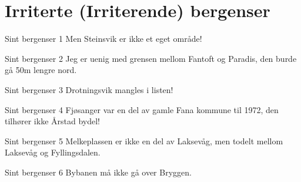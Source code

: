 \section{Irriterte (Irriterende) bergenser}
\begin{frame}
    \begin{block}{Sint bergenser 1}
        Men Steinsvik er ikke et eget område!
    \end{block}
    \pause
    \begin{block}{Sint bergenser 2}
        Jeg er uenig med grensen mellom Fantoft og Paradis, den burde gå 50m lengre nord.
    \end{block}
    \pause
    \begin{block}{Sint bergenser 3}
        Drotningsvik mangles i listen!
    \end{block}
\end{frame}

\begin{frame}
    \begin{block}{Sint bergenser 4}
        Fjøsanger var en del av gamle Fana kommune til 1972, den tilhører ikke Årstad bydel!
    \end{block}
    \pause
    \begin{block}{Sint bergenser 5}
        Melkeplassen er ikke en del av Laksevåg, men todelt mellom Laksevåg og Fyllingsdalen.
    \end{block}
    \pause
    \begin{block}{Sint bergenser 6}
        Bybanen må ikke gå over Bryggen.
    \end{block}
\end{frame}